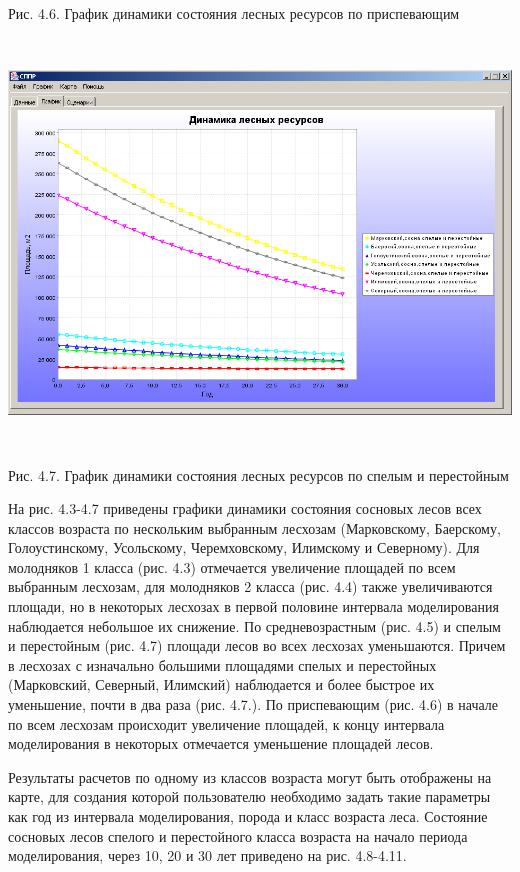 \documentclass{article}
\begin{document}
\begin{center}
Рис. 4.6. График динамики состояния лесных ресурсов 
по приспевающим

\includegraphics[width=449pt, height=307pt, keepaspectratio=true]{asyaDisser9_3-fig018.png}

Рис. 4.7. График динамики состояния лесных ресурсов 
по спелым и перестойным
\end{center}

На рис. 4.3-4.7 приведены графики динамики состояния 
сосновых лесов всех классов возраста по нескольким 
выбранным лесхозам (Марковскому, Баерскому, 
Голоустинскому, Усольскому, Черемховскому, 
Илимскому и Северному). Для молодняков 1 класса 
(рис. 4.3) отмечается увеличение площадей по всем 
выбранным лесхозам, для молодняков 2 класса 
(рис. 4.4) также увеличиваются площади, но в некоторых 
лесхозах в первой половине интервала моделирования 
наблюдается небольшое их снижение. По средневозрастным 
(рис. 4.5) и спелым и перестойным (рис. 4.7) площади 
лесов во всех лесхозах уменьшаются. Причем 
в лесхозах с изначально большими площадями 
спелых и перестойных (Марковский, Северный, 
Илимский) наблюдается и более быстрое их уменьшение, 
почти в два раза (рис. 4.7.). По приспевающим (рис. 
4.6) в начале по всем лесхозам происходит увеличение 
площадей, к концу интервала моделирования в 
некоторых отмечается уменьшение площадей лесов.

Результаты расчетов по одному из классов возраста 
могут быть отображены на карте, для создания 
которой пользователю необходимо задать такие 
параметры как год из интервала моделирования, 
порода и класс возраста леса. Состояние сосновых 
лесов спелого и перестойного класса возраста 
на начало периода моделирования, через 10, 20 
и 30 лет приведено на рис. 4.8-4.11.
\end{document}
